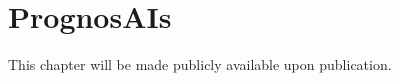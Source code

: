 \chapter{PrognosAIs}\label{chap:prognosais}

This chapter will be made publicly available upon publication.
